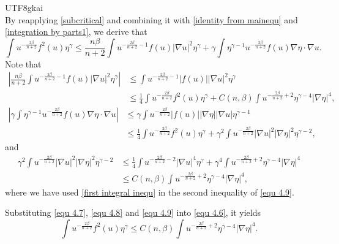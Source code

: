 \documentclass[reqno,12pt]{amsart}
\numberwithin{equation}{section}
\begin{document}
\begin{CJK}{UTF8}{gkai}
\begin{equation}
  \end{equation}
 By reapplying \eqref{subcritical} and combining it with \eqref{identity from mainequ} and \eqref{integration by parts1}, we derive that
 \begin{equation}\label{equ 4.6}
 		 \int u^{-\frac{2\beta}{n+2}} f^{2}(u)\eta^{\gamma}\le \frac{n\beta}{n+2}\int u^{-\frac{2\beta}{n+2}-1} f(u)|\nabla u|^{2}\eta^{\gamma}+\gamma\int \eta^{\gamma-1}u^{-\frac{2\beta}{n+2}}f(u)\nabla\eta\cdot \nabla u.
 \end{equation}
 Note that
 \begin{equation}\label{equ 4.7}
 	\begin{aligned}
 		\left| \frac{n\beta}{n+2}\int u^{-\frac{2\beta}{n+2}-1} f(u)|\nabla u|^{2}\eta^{\gamma} \right|&\le \int u^{-\frac{2\beta}{n+2}-1} |f(u)| |\nabla u|^{2}\eta^{\gamma}\\
 		&\le \frac{1}{4}  \int u^{-\frac{2\beta}{n+2}} f^{2}(u)\eta^{\gamma}
 		+C(n,\beta)\int  u^{-\frac{2\beta}{n+2}+2}\eta^{\gamma-4}|\nabla \eta|^{4},
 	\end{aligned}
 \end{equation}
 \begin{equation}\label{equ 4.8}
 	\begin{aligned}
 		\left| \gamma\int \eta^{\gamma-1}u^{-\frac{2\beta}{n+2}}f(u)\nabla\eta\cdot \nabla u \right|&\le  \gamma\int u^{-\frac{2\beta}{n+2}}|f(u)| |\nabla\eta| |\nabla u| \eta^{\gamma-1}\\
 		&\le \frac{1}{4}  \int u^{-\frac{2\beta}{n+2}} f^{2}(u)\eta^{\gamma}
 		+\gamma^{2}\int  u^{-\frac{2\beta}{n+2}}|\nabla u|^{2}|\nabla \eta|^{2}\eta^{\gamma-2},
 	\end{aligned}
 \end{equation}
 and
 \begin{equation}\label{equ 4.9}
 	\begin{aligned}
 		\gamma^{2}\int  u^{-\frac{2\beta}{n+2}}|\nabla u|^{2}|\nabla \eta|^{2}\eta^{\gamma-2}&\le \frac{1}{4} \int u^{-\frac{2\beta}{n+2}-2}|\nabla u|^{4}\eta^{\gamma}+\gamma^{4} \int  u^{-\frac{2\beta}{n+2}+2}\eta^{\gamma-4}|\nabla \eta|^{4}\\
 		&\le C(n,\beta)\int  u^{-\frac{2\beta}{n+2}+2}\eta^{\gamma-4}|\nabla \eta|^{4},
 	\end{aligned}
 \end{equation}
  where we have used \eqref{first integral inequ} in the second inequality of \eqref{equ 4.9}.
  
   \noindent Substituting \eqref{equ 4.7}, \eqref{equ 4.8} and \eqref{equ 4.9} into \eqref{equ 4.6}, it yields
   \begin{equation}\label{second integral inequality}
   	\int u^{-\frac{2\beta}{n+2}} f^{2}(u)\eta^{\gamma}\le C(n,\beta)\int  u^{-\frac{2\beta}{n+2}+2}\eta^{\gamma-4}|\nabla \eta|^{4}.
   \end{equation}
   

\end{CJK}
\end{document}
